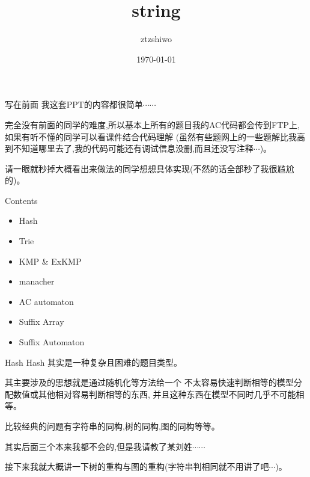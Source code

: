 \documentclass[10pt]{beamer}
\begin{document}
	\title{string}
	\author{ztzshiwo}
	\date{\today}
	\begin{frame}
		\maketitle
	\end{frame}
	\begin{frame}{写在前面}
		我这套PPT的内容都很简单$\cdots \cdots$

		\vspace{3ex}

		完全没有前面的同学的难度,所以基本上所有的题目我的AC代码都会传到FTP上,
		如果有听不懂的同学可以看课件结合代码理解
		(虽然有些题网上的一些题解比我高到不知道哪里去了,我的代码可能还有调试信息没删,而且还没写注释$\cdots$)。

		\vspace{3ex}

		请一眼就秒掉大概看出来做法的同学想想具体实现(不然的话全部秒了我很尴尬的)。
	\end{frame}
	\begin{frame}{Contents}
		\begin{itemize}
			\item Hash
			\item Trie
			\item KMP \& ExKMP
			\item manacher
			\item AC automaton
			\item Suffix Array
			\item Suffix Automaton
		\end{itemize}
	\end{frame}  
	\begin{frame}{Hash}
		Hash 其实是一种复杂且困难的题目类型。\pause


		\vspace{2ex}
		其主要涉及的思想就是通过随机化等方法给一个
		不太容易快速判断相等的模型分配数值或其他相对容易判断相等的东西,
		并且这种东西在模型不同时几乎不可能相等。\pause

		\vspace{2ex}

		比较经典的问题有字符串的同构,树的同构,图的同构等等。\pause

		其实后面三个本来我都不会的,但是我请教了某刘姓$\cdots \cdots$

		接下来我就大概讲一下树的重构与图的重构(字符串判相同就不用讲了吧$\cdots$)。
	\end{frame}
\end{document}
